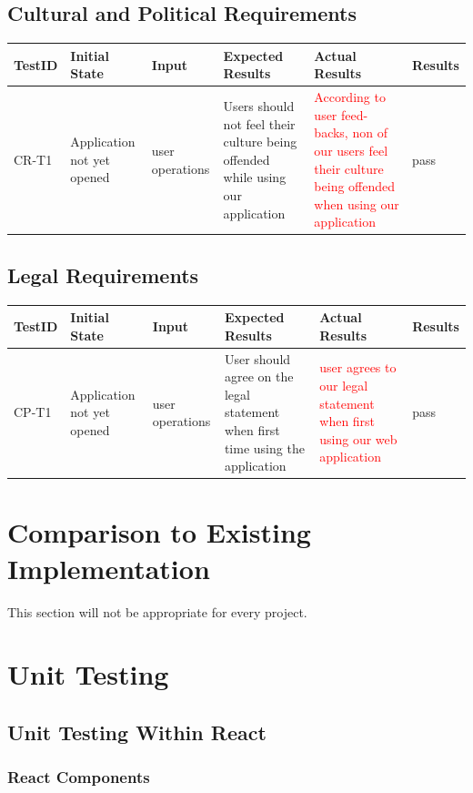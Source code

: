 \documentclass[12pt, oneside, openany, titlepage]{article}
\begin{document}
\subsection{Cultural and Political Requirements}
\begin{tabular}{ |p{1.5cm}| p{2cm} |p{2cm}| p{4cm}|p{3cm}|p{1.5cm}|  }
\hline
 TestID & Initial State & Input & Expected Results & Actual Results& Results\\ 
 \hline
 CR-T1 & Application not yet opened & user operations & Users should not feel their culture being offended while using our application &\textcolor{red}{According to user feed-backs, non of our users feel their culture being offended when using our application} & pass\\
 \hline
\end{tabular}
\subsection{Legal Requirements}
\begin{tabular}{ |p{1.5cm}| p{2cm} |p{2cm}| p{4cm}|p{3cm}|p{1.5cm}|  }
\hline
 TestID & Initial State & Input & Expected Results & Actual Results&Results\\ 
 \hline
 CP-T1 & Application not yet opened & user operations & User should agree on the legal statement when first time using the application &\textcolor{red}{user agrees to our legal statement when first using our web application} & pass\\
 \hline
\end{tabular}

\section{Comparison to Existing Implementation}	

This section will not be appropriate for every project.

\section{Unit Testing}
\subsection{Unit Testing Within React}
\subsubsection{React Components}
\end{document}
